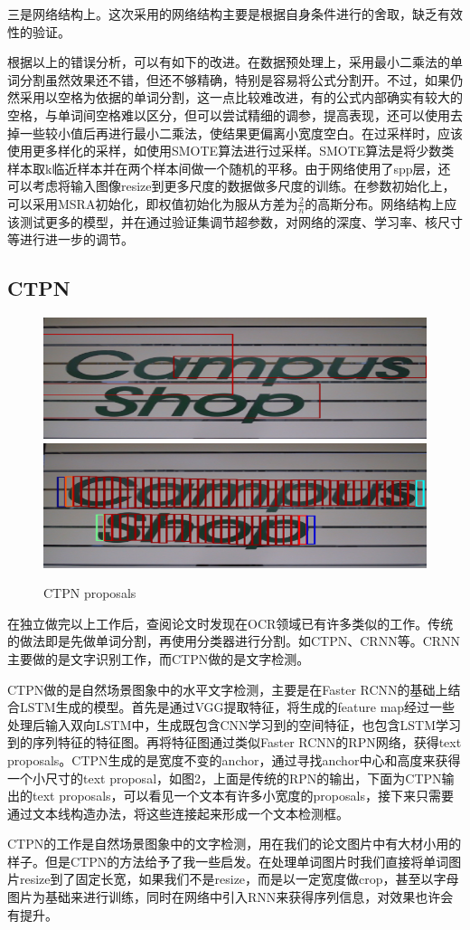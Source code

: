 \documentclass[12pt]{article}
\begin{document}
三是网络结构上。这次采用的网络结构主要是根据自身条件进行的舍取，缺乏有效性的验证。

根据以上的错误分析，可以有如下的改进。在数据预处理上，采用最小二乘法的单词分割虽然效果还不错，但还不够精确，特别是容易将公式分割开。不过，如果仍然采用以空格为依据的单词分割，这一点比较难改进，有的公式内部确实有较大的空格，与单词间空格难以区分，但可以尝试精细的调参，提高表现，还可以使用去掉一些较小值后再进行最小二乘法，使结果更偏离小宽度空白。在过采样时，应该使用更多样化的采样，如使用SMOTE算法进行过采样。SMOTE算法是将少数类样本取k临近样本并在两个样本间做一个随机的平移。由于网络使用了spp层，还可以考虑将输入图像resize到更多尺度的数据做多尺度的训练。在参数初始化上，可以采用MSRA初始化，即权值初始化为服从方差为$\frac 2 n$的高斯分布。\cite{msra}网络结构上应该测试更多的模型，并在通过验证集调节超参数，对网络的深度、学习率、核尺寸等进行进一步的调节。

\subsection{CTPN}
\noindent

\begin{figure}[hp]
    \centering
    \includegraphics[scale=0.5]{rpn.png}
    \includegraphics[scale=0.5]{ctpn.png}
    \caption{CTPN proposals}
    \label{fig:label}
\end{figure}

在独立做完以上工作后，查阅论文时发现在OCR领域已有许多类似的工作。传统的做法即是先做单词分割，再使用分类器进行分割。如CTPN\cite{ctpn}、CRNN等。CRNN主要做的是文字识别工作，而CTPN做的是文字检测。

CTPN做的是自然场景图象中的水平文字检测，主要是在Faster RCNN的基础上结合LSTM生成的模型。首先是通过VGG提取特征，将生成的feature map经过一些处理后输入双向LSTM中，生成既包含CNN学习到的空间特征，也包含LSTM学习到的序列特征的特征图。再将特征图通过类似Faster RCNN的RPN网络，获得text proposals。CTPN生成的是宽度不变的anchor，通过寻找anchor中心和高度来获得一个小尺寸的text proposal，如图2，上面是传统的RPN的输出，下面为CTPN输出的text proposals，可以看见一个文本有许多小宽度的proposals，接下来只需要通过文本线构造办法，将这些连接起来形成一个文本检测框。

CTPN的工作是自然场景图象中的文字检测，用在我们的论文图片中有大材小用的样子。但是CTPN的方法给予了我一些启发。在处理单词图片时我们直接将单词图片resize到了固定长宽，如果我们不是resize，而是以一定宽度做crop，甚至以字母图片为基础来进行训练，同时在网络中引入RNN来获得序列信息，对效果也许会有提升。


\end{document}
